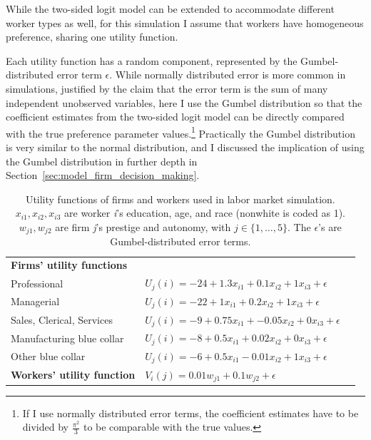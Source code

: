 While the two-sided logit model can be extended to accommodate different worker types as well, for
this simulation I assume that workers have homogeneous preference, sharing one
utility function.

Each utility function has a random component, represented by the
Gumbel-distributed error term $\epsilon$. While normally distributed error is
more common in simulations, justified by the claim that the error term is
the sum of many independent unobserved variables, here I use the Gumbel
distribution so that the coefficient estimates from the two-sided logit model can be
directly compared with the true preference parameter values.\footnote{If I use
  normally distributed error terms, the coefficient estimates have to be divided
by $\frac{\pi^2}{3}$ to be comparable with the true values.} Practically the
Gumbel distribution is very similar to the normal distribution, and I discussed
the implication of using the Gumbel distribution in further depth in Section~\ref{sec:model_firm_decision_making}.

\begin{table}[!ht]
\centering
\caption[Utility functions used in labor market simulations.]{Utility functions
  of firms and workers used in labor market simulation. $x_{i1}, x_{i2}, x_{i3}$ are worker \textit{i}'s education, age, and race (nonwhite is coded as 1). $w_{j1}, w_{j2}$ are firm \textit{j}'s prestige and autonomy, with $j \in \{1, \dots, 5\}$. The $\epsilon$'s are Gumbel-distributed error terms.}
\label{tab:sim_labor_nojobs_utility_functions}
\begin{tabular}{lll}
\\[-1.8ex]\hline
\textbf{Firms' utility functions}  &                                                                                     \\
Professional                         & $U_{j}(i) = -24 + 1.3 x_{i1} + 0.1 x_{i2} + 1 x_{i3} + \epsilon$         \\
Managerial                           & $U_{j}(i) = -22 + 1 x_{i1} + 0.2 x_{i2} + 1 x_{i3} + \epsilon$     \\
Sales, Clerical, Services            & $U_{j}(i) = -9 + 0.75 x_{i1} + -0.05 x_{i2} + 0 x_{i3} + \epsilon$ \\
Manufacturing blue collar            & $U_{j}(i) = -8 + 0.5 x_{i1} + 0.02 x_{i2} + 0 x_{i3} + \epsilon$   \\
Other blue collar                    & $U_{j}(i) = -6 + 0.5 x_{i1} - 0.01 x_{i2} + 1 x_{i3} + \epsilon$   \\
  \hline
\textbf{Workers' utility function} & $V_{i}(j) = 0.01 w_{j1} + 0.1 w_{j2} + \epsilon$                   \\
  \hline
\end{tabular}
\end{table}

